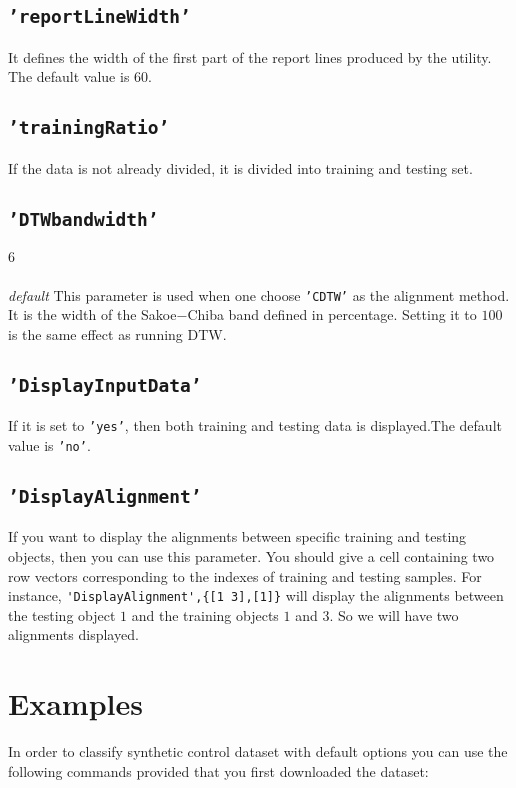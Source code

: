 \documentclass{article}
\newcommand{\parametre}[1]{\texttt{#1}}
\newcommand{\matlabfile}[1]{}
\begin{document}
\subsection{\parametre{'reportLineWidth'}}
It defines the width of the first part of the report lines produced by the utility. The default value is $60$.

\subsection{\parametre{'trainingRatio'}}
If the data is not already divided, it is divided into training and testing set.

\subsection{\parametre{'DTWbandwidth'}} 
\subparagraph*{$6$} \textit{default} This parameter is used when one choose \parametre{'CDTW'} as the alignment method. 
It is the width of the Sakoe$-$Chiba band defined in percentage. Setting it to $100$ is the same effect as running DTW.\@

\subsection{\parametre{'DisplayInputData'}} 
If it is set to \parametre{'yes'}, then both training and testing data is displayed.The default value is \parametre{'no'}.

\subsection{\parametre{'DisplayAlignment'}}
If you want to display the alignments between specific training and testing objects, then you can use this parameter. 
You should give a cell containing two row vectors corresponding to the indexes of training and testing samples. 
For instance, \verb|'DisplayAlignment',{[1 3],[1]}| will display the alignments between the testing object $1$ and the training objects $1$ and $3$. 
So we will have two alignments displayed.

\section{Examples}
In order to classify synthetic control dataset with default options you can use the following commands provided that you first downloaded the dataset:
\begin{scriptsize}
\matlabfile{tscu_manual_verbatim04.out}
\end{scriptsize}
\end{document}
